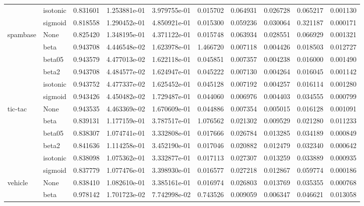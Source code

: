 \begin{tabular}{llrrrrrrrr}
        & isotonic &  0.831601 &  1.253881e-01 &  3.979755e-01 &   0.015702 &  0.064931 &  0.026728 &  0.065217 &  0.001130 \\
        & sigmoid &  0.818558 &  1.290452e-01 &  4.850921e-01 &   0.015300 &  0.059236 &  0.030064 &  0.321187 &  0.000171 \\
spambase & None &  0.825420 &  1.348195e-01 &  4.371122e-01 &   0.015748 &  0.063934 &  0.028551 &  0.066929 &  0.001321 \\
        & beta &  0.943708 &  4.446548e-02 &  1.623978e-01 &   1.466720 &  0.007118 &  0.004426 &  0.018503 &  0.012727 \\
        & beta05 &  0.943579 &  4.477013e-02 &  1.622118e-01 &   0.045851 &  0.007357 &  0.004238 &  0.016000 &  0.001490 \\
        & beta2 &  0.943708 &  4.484577e-02 &  1.624947e-01 &   0.045222 &  0.007130 &  0.004264 &  0.016045 &  0.001142 \\
        & isotonic &  0.943752 &  4.477337e-02 &  1.625452e-01 &   0.045128 &  0.007192 &  0.004257 &  0.016114 &  0.001280 \\
        & sigmoid &  0.943426 &  4.450482e-02 &  1.729487e-01 &   0.044060 &  0.006976 &  0.004403 &  0.034555 &  0.000799 \\
tic-tac & None &  0.943535 &  4.463369e-02 &  1.670609e-01 &   0.044886 &  0.007354 &  0.005015 &  0.016128 &  0.001091 \\
        & beta &  0.839131 &  1.177159e-01 &  3.787517e-01 &   1.076562 &  0.021302 &  0.009529 &  0.021280 &  0.011233 \\
        & beta05 &  0.838307 &  1.074741e-01 &  3.332808e-01 &   0.017666 &  0.026784 &  0.013285 &  0.034189 &  0.000849 \\
        & beta2 &  0.841636 &  1.114258e-01 &  3.452190e-01 &   0.017046 &  0.020882 &  0.012479 &  0.032340 &  0.000642 \\
        & isotonic &  0.838098 &  1.075362e-01 &  3.332877e-01 &   0.017113 &  0.027307 &  0.013259 &  0.033889 &  0.000935 \\
        & sigmoid &  0.837779 &  1.077476e-01 &  3.398930e-01 &   0.016577 &  0.027218 &  0.012867 &  0.059774 &  0.000186 \\
vehicle & None &  0.838410 &  1.082610e-01 &  3.385161e-01 &   0.016974 &  0.026803 &  0.013769 &  0.035355 &  0.000768 \\
        & beta &  0.978142 &  1.701723e-02 &  7.742998e-02 &   0.743526 &  0.009059 &  0.006347 &  0.046621 &  0.013058 \\

\end{tabular}
